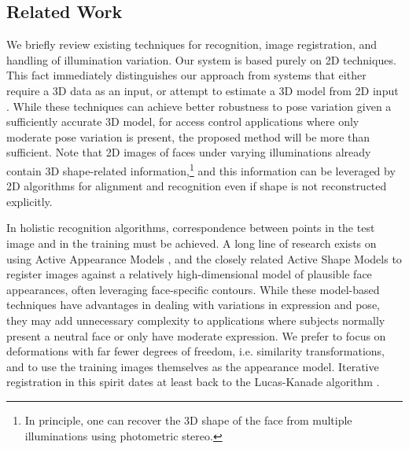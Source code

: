 \documentclass[10pt,journal,letterpaper,compsoc]{IEEEtran} %
\begin{document}
\vspace{-0mm}
\subsection{Related Work}
We briefly review existing techniques for recognition, image
registration, and handling of illumination variation.  Our
system is based purely on 2D techniques.  This fact immediately
distinguishes our approach from systems that either require a
3D data as an input, or attempt to estimate a 3D model from 2D
input \cite{amberg2007reconstructing,Blanz2003-PAMI}.  While
these techniques can achieve better robustness to pose
variation given a sufficiently accurate 3D model, for access
control applications where only moderate pose variation is
present, the proposed method will be more than sufficient.
Note that 2D images of faces under varying illuminations
already contain 3D shape-related information,\footnote{In
principle, one can recover the 3D shape of the face from
multiple illuminations using photometric stereo.} and this
information can be leveraged by 2D algorithms for alignment and
recognition even if shape is not reconstructed explicitly.

In holistic recognition algorithms, correspondence between points in the test
image and in the training must be achieved.  A long line of research exists on
using Active Appearance Models \cite{Cootes2001-PAMI}, and the closely related
Active Shape Models \cite{cootes1992active} to register images against a
relatively high-dimensional model of plausible face appearances, often
leveraging face-specific contours.  While these model-based techniques have
advantages in dealing with variations in expression and pose, they may add
unnecessary complexity to applications where subjects normally present a neutral face
or only have moderate expression. We prefer to focus on deformations with far fewer
degrees of freedom, i.e. similarity transformations, and to use the training images themselves
as the appearance model. Iterative registration in this spirit dates at least back to the
Lucas-Kanade algorithm \cite{lucas1981iterative}.
\end{document}
